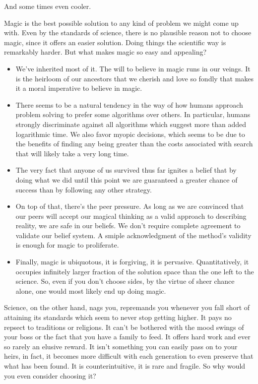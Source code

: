 \documentclass[11pt]{article}
\begin{document}
And some times even cooler.

Magic is the best possible solution to any kind of problem we might come up
with.  Even by the standards of science, there is no plausible reason not to
choose magic, since it offers an easier solution.  Doing things the
scientific way is remarkably harder.  But what makes magic so easy and
appealing?

\begin{itemize}
\item We've inherited most of it.  The will to believe in magic runs in our
veings.  It is the heirloom of our ancestors that we cherish and love so
fondly that makes it a moral imperative to believe in magic.
\item There seems to be a natural tendency in the way of how humans approach
problem solving to prefer some algorithms over others.  In particular,
humans strongly discriminate against all algorithms which suggest more than
added logarithmic time.  We also favor myopic decisions, which seems to be
due to the benefits of finding any being greater than the costs associated
with search that will likely take a very long time.
\item The very fact that anyone of us survived thus far ignites a belief
that by doing what we did until this point we are guaranteed a greater
chance of success than by following any other strategy.
\item On top of that, there's the peer pressure.  As long as we are convinced that 
our peers will accept our magical thinking as a valid approach to
describing reality, we are safe in our beliefs.  We don't require complete
agreement to validate our belief system.  A smiple acknowledgment of the
method's validity is enough for magic to proliferate.
\item Finally, magic is ubiquotous, it is forgiving, it is pervasive.  
Quantitatively, it occupies infinitely larger fraction of the solution
space than the one left to the science.  So, even if you don't choose
sides, by the virtue of sheer chance alone, one would most likely end up
doing magic.
\end{itemize}

Science, on the other hand, nags you, repremands you whenever you fall short
of attaining its standards which seem to never stop getting higher.  It pays
no repsect to traditions or religions.  It can't be bothered with the mood
swings of your boss or the fact that you have a family to feed.  It offers
hard work and ever so rarely an elusive reward.  It isn't something you can
easily pass on to your heirs, in fact, it becomes more difficult with each
generation to even preserve that what has been found.  It is
counterintuitive, it is rare and fragile.  So why would you even consider
choosing it?
\end{document}
